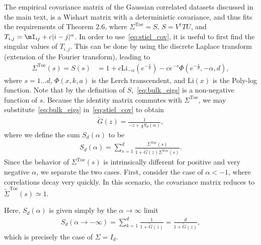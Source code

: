 \documentclass{article}
\begin{document}
The empirical covariance matrix of the Gaussian correlated datasets discussed in the main text, is a Wishart matrix with a deterministic covariance, and thus fits the requirements of Theorem 2.6, where $\Sigma^\mathrm{Toe}=S$, $S = V^\dagger T U$, and $T_{i,j}=\mI_{ij}+c|i-j|^\alpha$. 
In order to use~\cref{eq:stiel_cov}, it is useful to first find the singular values of $T_{i,j}$. This can be done by using the discrete Laplace transform (extension of the Fourier transform), leading to  
\begin{align}
\label{eq:bulk_eigs}
    \Sigma^\mathrm{Toe}(s)= S(s)
    &=
   1
   +c \text{Li}_{-\alpha }\left(e^{-\frac{s}{d}}\right)
   -c e^{-s} \Phi \left(e^{-\frac{s}{d}},-\alpha ,d\right), 
\end{align}
where $s=1\ldots d$, $\Phi(x,k,a)$ is the Lerch transcendent, and $\text{Li}(x)$ is the Poly-log function.
Note that by the definition of $S$,~\cref{eq:bulk_eigs} is a non-negative function of $s$.
Because the identity matrix commutes with $\Sigma^\mathrm{Toe}$, we may substitute~\cref{eq:bulk_eigs} in~\cref{eq:stiel_cov} to obtain
\begin{align}
\label{eq:stiel_solve}
\tilde{G}(z) =
\frac{1}
    {-z+\frac{\gamma}{d} S_d(\alpha)
    },
\end{align}
where we define the sum $S_d(\alpha)$ to be
\begin{align}
\label{eq:sum}
S_d(\alpha)=\sum_{s=1}^d
\frac{{\Sigma}^\mathrm{Toe}(s)}{1+ \tilde{G}(z) {\Sigma}^\mathrm{Toe}(s)}
     .
\end{align}
Since the behavior of ${\Sigma}^\mathrm{Toe}(s)$ is intrinsically different for positive and very negative $\alpha$, we separate the two cases. 
First, consider the case of $\alpha <-1$, where correlations decay very quickly. In this scenario, the covariance matrix reduces to $\tilde{\Sigma}^\mathrm{Toe}(s)\simeq 1$. 

Here, $S_d(\alpha)$ is given simply by the $\alpha \to \infty$ limit
\begin{align}
S_d(\alpha \to -\infty)=\sum_{k=1}^d
    \frac{1}{1+\tilde{G}(z) }
    =
    \frac{d}{1+\tilde{G}(z) }
    ,
\end{align}
which is precisely the case of $\Sigma = I_d$.
\end{document}
